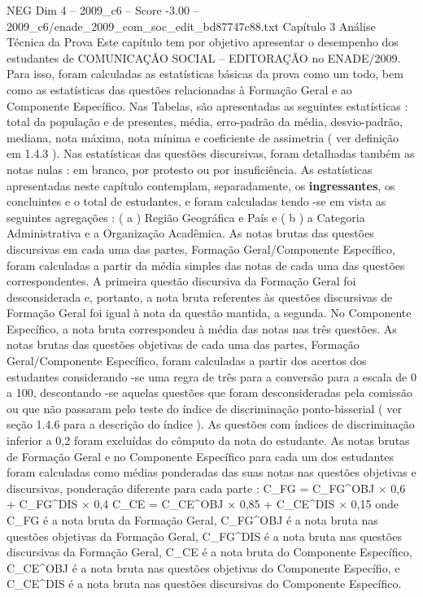 \begin{textsample}{NEG Dim 4 – 2009\_c6 – Score -3.00 – 2009\_c6/enade\_2009\_com\_soc\_edit\_bd87747c88.txt}  \label{ex:f4_neg_034}
Capítulo 3 Análise Técnica da Prova Este capítulo tem por objetivo apresentar o desempenho dos estudantes de COMUNICAÇÃO SOCIAL – EDITORAÇÃO no ENADE/2009.
Para isso, foram calculadas as estatísticas básicas da prova como um todo, bem como as estatísticas das questões relacionadas à Formação Geral e ao Componente Específico.
Nas Tabelas, são apresentadas as seguintes estatísticas : total da população e de presentes, média, erro-padrão da média, desvio-padrão, mediana, nota máxima, nota mínima e coeficiente de assimetria ( ver definição em 1.4.3 ).
Nas estatísticas das questões discursivas, foram detalhadas também as notas nulas : em branco, por protesto ou por insuficiência.
As estatísticas apresentadas neste capítulo contemplam, separadamente, os \textbf{ingressantes}, os concluintes e o total de estudantes, e foram calculadas tendo -se em vista as seguintes agregações : ( a ) Região Geográfica e País e ( b ) a Categoria Administrativa e a Organização Acadêmica.
As notas brutas das questões discursivas em cada uma das partes, Formação Geral/Componente Específico, foram calculadas a partir da média simples das notas de cada uma das questões correspondentes.
A primeira questão discursiva da Formação Geral foi desconsiderada e, portanto, a nota bruta referentes às questões discursivas de Formação Geral foi igual à nota da questão mantida, a segunda.
No Componente Específico, a nota bruta correspondeu à média das notas nas três questões.
As notas brutas das questões objetivas de cada uma das partes, Formação Geral/Componente Específico, foram calculadas a partir dos acertos dos estudantes considerando -se uma regra de três para a conversão para a escala de 0 a 100, descontando -se aquelas questões que foram desconsideradas pela comissão ou que não passaram pelo teste do índice de discriminação ponto-bisserial ( ver seção 1.4.6 para a descrição do índice ).
As questões com índices de discriminação inferior a 0,2 foram excluídas do cômputo da nota do estudante.
As notas brutas de Formação Geral e no Componente Específico para cada um dos estudantes foram calculadas como médias ponderadas das suas notas nas questões objetivas e discursivas, ponderação diferente para cada parte : C\_FG = C\_FG\textasciicircum{}OBJ × 0,6 + C\_FG\textasciicircum{}DIS × 0,4 C\_CE = C\_CE\textasciicircum{}OBJ × 0,85 + C\_CE\textasciicircum{}DIS × 0,15 onde C\_FG é a nota bruta da Formação Geral, C\_FG\textasciicircum{}OBJ é a nota bruta nas questões objetivas da Formação Geral, C\_FG\textasciicircum{}DIS é a nota bruta nas questões discursivas da Formação Geral, C\_CE é a nota bruta do Componente Específico, C\_CE\textasciicircum{}OBJ é a nota bruta nas questões objetivas do Componente Específio, e C\_CE\textasciicircum{}DIS é a nota bruta nas questões discursivas do Componente Específico.

\end{textsample}
